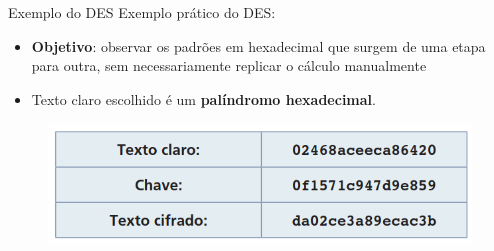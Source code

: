 \begin{frame}{Exemplo do DES}
    Exemplo prático do DES:

    \begin{itemize}
        \item \textbf{Objetivo}: observar os padrões em hexadecimal que surgem de uma etapa para outra, sem necessariamente replicar o cálculo manualmente

        \item Texto claro escolhido é um \textbf{palíndromo hexadecimal}.

    \end{itemize}

    \begin{figure}
        \centering
        \includegraphics[width=0.5\linewidth]{Figuras/palindromo-hexadecimal-des.png}
    \end{figure}
\end{frame}




